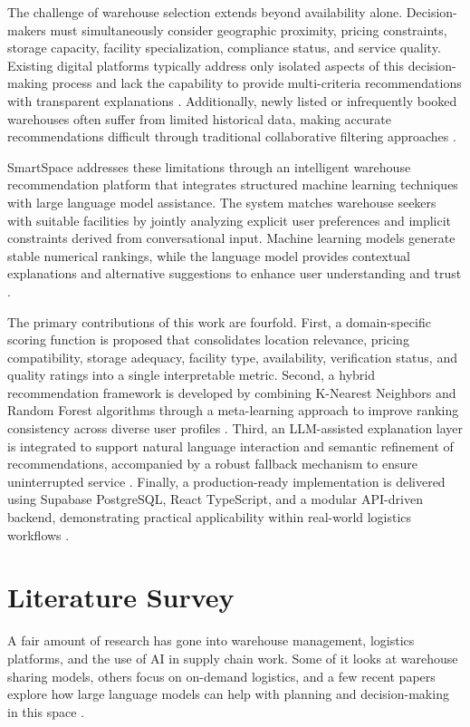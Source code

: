 \documentclass[conference]{IEEEtran}
\begin{document}
The challenge of warehouse selection extends beyond availability alone. Decision-makers must simultaneously consider geographic proximity, pricing constraints, storage capacity, facility specialization, compliance status, and service quality. Existing digital platforms typically address only isolated aspects of this decision-making process and lack the capability to provide multi-criteria recommendations with transparent explanations \cite{b2}. Additionally, newly listed or infrequently booked warehouses often suffer from limited historical data, making accurate recommendations difficult through traditional collaborative filtering approaches \cite{b10}.

SmartSpace addresses these limitations through an intelligent warehouse recommendation platform that integrates structured machine learning techniques with large language model assistance. The system matches warehouse seekers with suitable facilities by jointly analyzing explicit user preferences and implicit constraints derived from conversational input. Machine learning models generate stable numerical rankings, while the language model provides contextual explanations and alternative suggestions to enhance user understanding and trust \cite{b3}.

The primary contributions of this work are fourfold. First, a domain-specific scoring function is proposed that consolidates location relevance, pricing compatibility, storage adequacy, facility type, availability, verification status, and quality ratings into a single interpretable metric. Second, a hybrid recommendation framework is developed by combining K-Nearest Neighbors and Random Forest algorithms through a meta-learning approach to improve ranking consistency across diverse user profiles \cite{b5}. Third, an LLM-assisted explanation layer is integrated to support natural language interaction and semantic refinement of recommendations, accompanied by a robust fallback mechanism to ensure uninterrupted service \cite{b7}. Finally, a production-ready implementation is delivered using Supabase PostgreSQL, React TypeScript, and a modular API-driven backend, demonstrating practical applicability within real-world logistics workflows \cite{b6}.

\section{Literature Survey}
A fair amount of research has gone into warehouse management, logistics platforms, and the use of AI in supply chain work. Some of it looks at warehouse sharing models, others focus on on-demand logistics, and a few recent papers explore how large language models can help with planning and decision-making in this space \cite{b7}.
\end{document}
